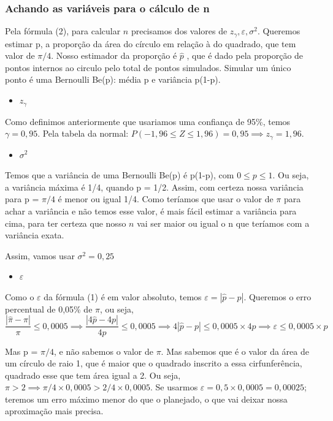 \documentclass{article}
\begin{document}
\subsubsection{Achando as variáveis para o cálculo de n}
Pela fórmula (2), para calcular $n$ precisamos dos valores de $z_\gamma, \varepsilon, \sigma^2$.
Queremos estimar p, a proporção da área do círculo em relação à do quadrado, que tem valor de $\pi/4$. Nosso estimador da proporção é $\widehat{p}$ , que é dado pela proporção de pontos internos ao circulo pelo total de pontos simulados. Simular um único ponto é uma Bernoulli Be(p): média p e variância p(1-p).

\begin{itemize}
\item $z_\gamma$
\end{itemize}
Como definimos anteriormente que usariamos uma confiança de 95\%, temos $\gamma = 0,95$. Pela tabela da normal: $P(-1,96 \leq Z \leq 1,96) = 0,95 \implies z_\gamma = 1,96$.

\begin{itemize}
\item $\sigma^2$
\end{itemize}
Temos que a variância de uma Bernoulli Be(p) é p(1-p), com $0 \leq p \leq 1$. Ou seja, a variância máxima é 1/4, quando p = 1/2. Assim, com certeza nossa variância para p = $ \pi/4$ é menor ou igual 1/4. Como teríamos que usar o valor de $ \pi$ para achar a variância e não temos esse valor, é mais fácil estimar a variância para cima, para ter certeza que nosso $n$ vai ser maior ou igual o n que teríamos com a variância exata.

Assim, vamos usar $\sigma^2 = 0,25$ 
\begin{itemize}
\item $\varepsilon$
\end{itemize}

Como o $\varepsilon$ da fórmula (1) é em valor absoluto, temos $\varepsilon = |\widehat{p} - p|$. Queremos o erro percentual de 0,05\% de $\pi$, ou seja,
\begin{equation}
    \frac{|\widehat{\pi} - \pi|}{\pi} \leq 0,0005 \implies \frac{|4\widehat{p} - 4p|}{4p} \leq 0,0005 \implies 
    4 |\widehat{p} - p| \leq 0,0005 \times 4p \implies
    \varepsilon \leq 0,0005 \times p
\end{equation}

Mas p = $\pi/4$, e não sabemos o valor de $\pi$. Mas sabemos que é o valor da área de um círculo de raio 1, que é maior que o quadrado inscrito a essa cirfunferência, quadrado esse que tem área igual a 2. Ou seja, $\pi>2 \implies \pi/4 \times 0,0005 > 2/4 \times 0,0005$. Se usarmos $\varepsilon = 0,5 \times 0,0005 = 0,00025 $; teremos um erro máximo menor do que o planejado, o que vai deixar nossa aproximação mais precisa.
\end{document}
